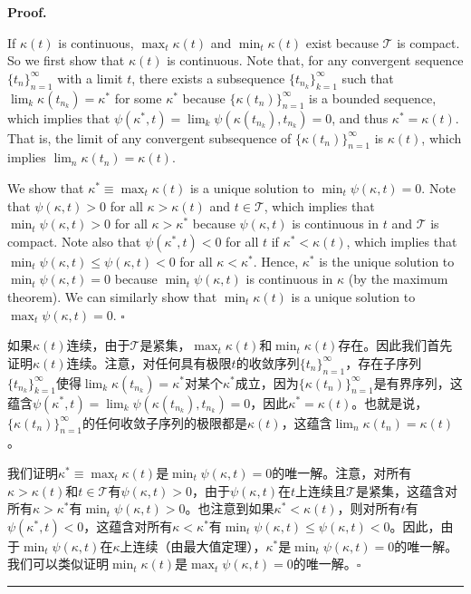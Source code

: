 \documentclass[12pt,a4paper]{article}
\newenvironment{original}
  {\par\medskip\noindent\color{black}\ignorespaces}
  {\par\medskip}
\newenvironment{translation}
  {\par\noindent\color{darkblue}\ignorespaces}
  {\par\medskip\noindent\hrule\par\medskip}
\theoremstyle{definition}
\theoremstyle{remark}
\begin{document}
\medskip
\noindent\textbf{Proof.}
\begin{original}
If $\kappa(t)$ is continuous, $\max_t \kappa(t)$ and $\min_t \kappa(t)$ exist because $\mathcal{T}$ is compact. So we first show that $\kappa(t)$ is continuous. Note that, for any convergent sequence $\{t_n\}_{n=1}^{\infty}$ with a limit $t$, there exists a subsequence $\{t_{n_k}\}_{k=1}^{\infty}$ such that $\lim_{k} \kappa(t_{n_k}) = \kappa^*$ for some $\kappa^*$ because $\{\kappa(t_n)\}_{n=1}^{\infty}$ is a bounded sequence, which implies that $\psi(\kappa^*, t) = \lim_k \psi(\kappa(t_{n_k}), t_{n_k}) = 0$, and thus $\kappa^* = \kappa(t)$. That is, the limit of any convergent subsequence of $\{\kappa(t_n)\}_{n=1}^{\infty}$ is $\kappa(t)$, which implies $\lim_n \kappa(t_n) = \kappa(t)$.

We show that $\kappa^* \equiv \max_t \kappa(t)$ is a unique solution to $\min_t \psi(\kappa, t) = 0$. Note that $\psi(\kappa, t) > 0$ for all $\kappa > \kappa(t)$ and $t \in \mathcal{T}$, which implies that $\min_t \psi(\kappa, t) > 0$ for all $\kappa > \kappa^*$ because $\psi(\kappa, t)$ is continuous in $t$ and $\mathcal{T}$ is compact. Note also that $\psi(\kappa^*, t) < 0$ for all $t$ if $\kappa^* < \kappa(t)$, which implies that $\min_t \psi(\kappa, t) \le \psi(\kappa, t) < 0$ for all $\kappa < \kappa^*$. Hence, $\kappa^*$ is the unique solution to $\min_t \psi(\kappa, t) = 0$ because $\min_t \psi(\kappa, t)$ is continuous in $\kappa$ (by the maximum theorem). We can similarly show that $\min_t \kappa(t)$ is a unique solution to $\max_t \psi(\kappa, t) = 0$. $\square$
\end{original}
\begin{translation}
如果$\kappa(t)$连续，由于$\mathcal{T}$是紧集，$\max_t \kappa(t)$和$\min_t \kappa(t)$存在。因此我们首先证明$\kappa(t)$连续。注意，对任何具有极限$t$的收敛序列$\{t_n\}_{n=1}^{\infty}$，存在子序列$\{t_{n_k}\}_{k=1}^{\infty}$使得$\lim_{k} \kappa(t_{n_k}) = \kappa^*$对某个$\kappa^*$成立，因为$\{\kappa(t_n)\}_{n=1}^{\infty}$是有界序列，这蕴含$\psi(\kappa^*, t) = \lim_k \psi(\kappa(t_{n_k}), t_{n_k}) = 0$，因此$\kappa^* = \kappa(t)$。也就是说，$\{\kappa(t_n)\}_{n=1}^{\infty}$的任何收敛子序列的极限都是$\kappa(t)$，这蕴含$\lim_n \kappa(t_n) = \kappa(t)$。

我们证明$\kappa^* \equiv \max_t \kappa(t)$是$\min_t \psi(\kappa, t) = 0$的唯一解。注意，对所有$\kappa > \kappa(t)$和$t \in \mathcal{T}$有$\psi(\kappa, t) > 0$，由于$\psi(\kappa, t)$在$t$上连续且$\mathcal{T}$是紧集，这蕴含对所有$\kappa > \kappa^*$有$\min_t \psi(\kappa, t) > 0$。也注意到如果$\kappa^* < \kappa(t)$，则对所有$t$有$\psi(\kappa^*, t) < 0$，这蕴含对所有$\kappa < \kappa^*$有$\min_t \psi(\kappa, t) \le \psi(\kappa, t) < 0$。因此，由于$\min_t \psi(\kappa, t)$在$\kappa$上连续（由最大值定理），$\kappa^*$是$\min_t \psi(\kappa, t) = 0$的唯一解。我们可以类似证明$\min_t \kappa(t)$是$\max_t \psi(\kappa, t) = 0$的唯一解。$\square$
\end{translation}
\end{document}
